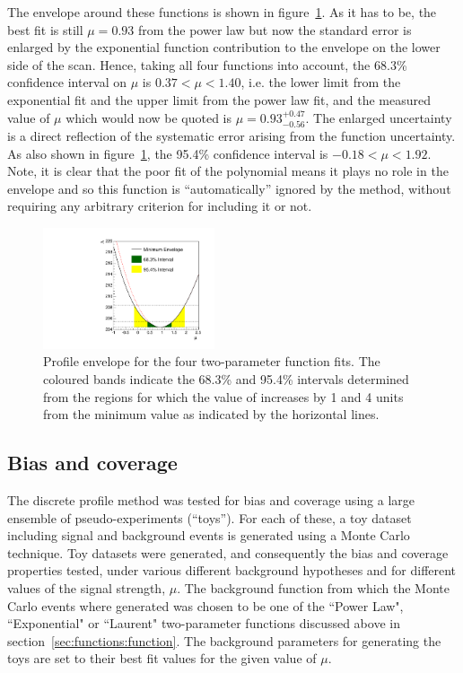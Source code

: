 The envelope around these functions is shown in
figure~\ref{fig:functions:envelope}.
As it has to be, the best fit is still $\mu=0.93$ from the power law
but now the standard error is enlarged by the exponential function
contribution to the
envelope on the lower side of the scan. Hence, taking all four functions into
account, the 68.3\% confidence interval on $\mu$ is
$0.37 < \mu < 1.40 $, i.e. the lower limit from the exponential fit and the
upper limit from the power law fit,
and the measured value of $\mu$ which would now be quoted is 
$\mu = 0.93_{-0.56}^{+0.47}$.
The enlarged uncertainty is a direct reflection of the
systematic error arising from the function uncertainty.
As also shown in figure~\ref{fig:functions:envelope}, the 95.4\% confidence 
interval is $-0.18 < \mu < 1.92$.
Note, it is clear that the poor fit of the polynomial
means it plays no role in the envelope and so this function is 
``automatically'' ignored by the method,
without requiring any arbitrary criterion for
including it or not.
%
\begin{figure}[tbp]
\centering
\includegraphics[width=0.45\textwidth]{functions/Envelope.pdf}
\caption{Profile \nll envelope for the four two-parameter function fits.
The coloured bands indicate the 68.3\% and 95.4\% intervals determined from the regions 
for which the value of \nll increases by 1 and 4 units from the minimum value as indicated by the horizontal lines.}
\label{fig:functions:envelope}
\end{figure}


\subsection{Bias and coverage}
\label{sec:functions:coverage}

The discrete profile method was tested for bias and coverage 
using a large ensemble of
pseudo-experiments (``toys''). For each of these, a toy
dataset including signal and background events is generated using a Monte Carlo technique. Toy datasets were generated, and consequently the bias and coverage properties tested, under various different background hypotheses and for different values of the signal strength, $\mu$. The background function from which the Monte Carlo events where generated was chosen to be one of the ``Power Law", ``Exponential" or ``Laurent" two-parameter functions discussed above in section~\ref{sec:functions:function}. The background parameters for generating the toys are set to their best fit values for the given value of $\mu$. 

